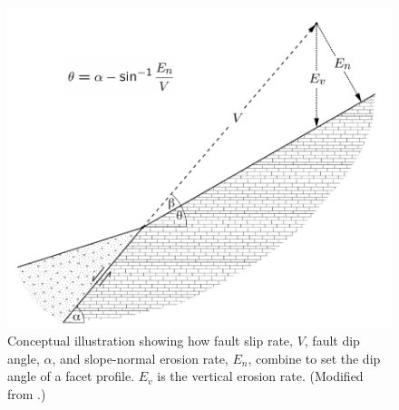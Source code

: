 \begin{figure}[ht!]
\centerline{\includegraphics{Figures/facet_schematic.pdf}}
\caption{Conceptual illustration showing how fault slip rate, $V$, fault dip angle, $\alpha$, and slope-normal erosion rate, $E_n$, combine to set the dip angle of a facet profile. $E_v$ is the vertical erosion rate. (Modified from \citet{tucker2011geomorphic}.)} 
\label{fig:facetschem}
\end{figure}


